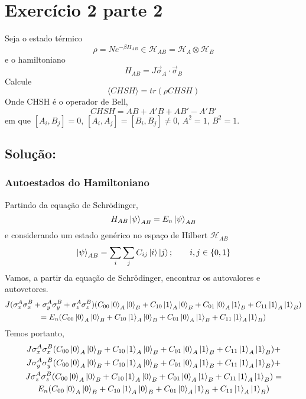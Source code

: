 \documentclass[
12pt,				%
openright,			%
oneside,			%
a4paper,			%
english,			%
french,				%
spanish,			%
brazil				%
]{abntex2}
\begin{document}
\chapter{Exercício 2 parte 2}
 Seja o estado térmico 
\begin{equation}
	\rho = N e^{-\beta H_{AB}} \in \mathcal{H}_{AB} = \mathcal{H}_A\otimes\mathcal{H}_{B}
\end{equation}
e o hamiltoniano
\begin{equation}
	H_{AB}=J \vec{\sigma}_A\cdot\vec{\sigma}_B
\end{equation}
Calcule 
\begin{equation}
	\langle CHSH\rangle = tr(\rho CHSH)
\end{equation}
Onde CHSH é o operador de Bell, 
\begin{equation}
	CHSH = AB+A'B+AB'-A'B'
\end{equation}
em que $[A_i,B_j]=0$, $[A_i,A_j]=[B_i,B_j]\neq0$, $A^2=1$, $B^2=1$.
\section{Solução: }
\subsection{Autoestados do Hamiltoniano}
Partindo da equação de Schrödinger, 
\begin{equation}
	H_{AB}\ket{\psi}_{AB}=E_n\ket{\psi}_{AB} 
\end{equation}
e considerando um estado genérico no espaço de Hilbert $\mathcal{H}_{AB}$
\begin{equation}
	\ket{\psi}_{AB}= \sum_i\sum_j C_{ij} \ket{i}\ket{j};\qquad i,j \in \{0,1\}
\end{equation}
Vamos, a partir da equação de Schrödinger, encontrar os autovalores e autovetores. 
\begin{multline}
	J(\sigma_x^A\sigma_x^B +\sigma_y^A\sigma_y^B + \sigma_z^A\sigma_z^B)(C_{00} \ket{0}_A\ket{0}_B+ C_{10} \ket{1}_A\ket{0}_B +C_{01}\ket{0}_A\ket{1}_B+C_{11} \ket{1}_A\ket{1}_B)\\= E_n(C_{00} \ket{0}_A\ket{0}_B+ C_{10} \ket{1}_A\ket{0}_B +C_{01}\ket{0}_A\ket{1}_B+C_{11} \ket{1}_A\ket{1}_B)
\end{multline}
Temos portanto,
\begin{multline}
	J\sigma_x^A\sigma_x^B (C_{00} \ket{0}_A\ket{0}_B+ C_{10} \ket{1}_A\ket{0}_B +C_{01}\ket{0}_A\ket{1}_B+C_{11} \ket{1}_A\ket{1}_B) + \\
	J\sigma_y^A\sigma_y^B (C_{00} \ket{0}_A\ket{0}_B+ C_{10} \ket{1}_A\ket{0}_B +C_{01}\ket{0}_A\ket{1}_B+C_{11} \ket{1}_A\ket{1}_B) + \\
    J\sigma_z^A\sigma_z^B (C_{00} \ket{0}_A\ket{0}_B+ C_{10} \ket{1}_A\ket{0}_B +C_{01}\ket{0}_A\ket{1}_B+C_{11} \ket{1}_A\ket{1}_B) = \\
    E_n(C_{00} \ket{0}_A\ket{0}_B+ C_{10} \ket{1}_A\ket{0}_B +C_{01}\ket{0}_A\ket{1}_B+C_{11} \ket{1}_A\ket{1}_B)
\end{multline}
\end{document}
